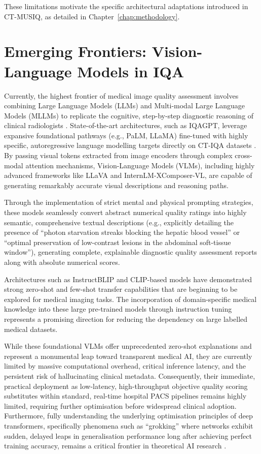 These limitations motivate the specific architectural adaptations introduced in CT-MUSIQ,
as detailed in Chapter~\ref{chap:methodology}.


\section{Emerging Frontiers: Vision-Language Models in IQA}
\label{sec:lit_vlm}

Currently, the highest frontier of medical image quality assessment involves combining
Large Language Models (LLMs) and Multi-modal Large Language Models (MLLMs) to replicate
the cognitive, step-by-step diagnostic reasoning of clinical radiologists \cite{wu2024mllm}.
State-of-the-art architectures, such as IQAGPT, leverage expansive foundational pathways
(e.g., PaLM, LLaMA) fine-tuned with highly specific, autoregressive language modelling
targets directly on CT-IQA datasets \cite{chen2024iqagpt}. By passing visual tokens
extracted from image encoders through complex cross-modal attention mechanisms,
Vision-Language Models (VLMs), including highly advanced frameworks like LLaVA
\cite{liu2023llava} and InternLM-XComposer-VL, are capable of generating remarkably
accurate visual descriptions and reasoning paths.

Through the implementation of strict mental and physical prompting strategies, these models
seamlessly convert abstract numerical quality ratings into highly semantic, comprehensive
textual descriptions (e.g., explicitly detailing the presence of ``photon starvation
streaks blocking the hepatic blood vessel'' or ``optimal preservation of low-contrast
lesions in the abdominal soft-tissue window''), generating complete, explainable diagnostic
quality assessment reports along with absolute numerical scores.

Architectures such as InstructBLIP \cite{dai2023instructblip} and CLIP-based models
\cite{radford2021clip} have demonstrated strong zero-shot and few-shot transfer capabilities
that are beginning to be explored for medical imaging tasks. The incorporation of
domain-specific medical knowledge into these large pre-trained models through instruction
tuning represents a promising direction for reducing the dependency on large labelled
medical datasets.

While these foundational VLMs offer unprecedented zero-shot explanations and represent a
monumental leap toward transparent medical AI, they are currently limited by massive
computational overhead, critical inference latency, and the persistent risk of
hallucinating clinical metadata. Consequently, their immediate, practical deployment as
low-latency, high-throughput objective quality scoring substitutes within standard,
real-time hospital PACS pipelines remains highly limited, requiring further optimisation
before widespread clinical adoption. Furthermore, fully understanding the underlying
optimisation principles of deep transformers, specifically phenomena such as ``grokking''
where networks exhibit sudden, delayed leaps in generalisation performance long after
achieving perfect training accuracy, remains a critical frontier in theoretical AI
research \cite{elhage2021mathematical}.


